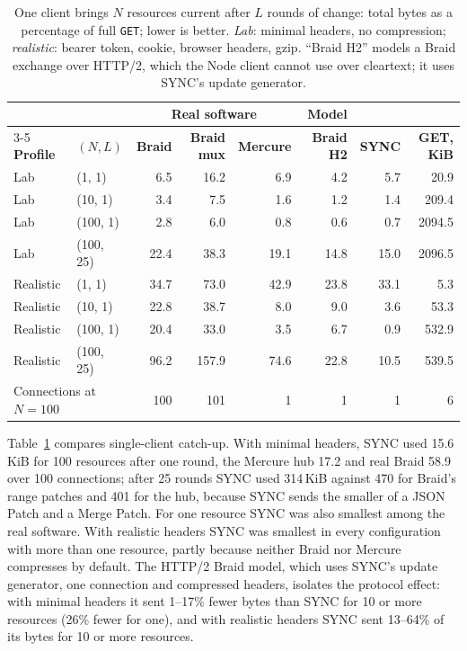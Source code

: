 \documentclass[11pt,a4paper]{article}
\begin{document}
\begin{table}[h]
\centering
\footnotesize
\setlength{\tabcolsep}{4pt}
\begin{tabular}{llrrrrrr}
\toprule
 & & \multicolumn{3}{c}{\textbf{Real software}} & \textbf{Model} & & \\
\cmidrule(lr){3-5}
\textbf{Profile} & $(N, L)$ & \textbf{Braid} & \textbf{Braid mux} & \textbf{Mercure} & \textbf{Braid H2} & \textbf{SYNC} & \textbf{GET, KiB} \\
\midrule
Lab       & (1, 1)    & 6.5  & 16.2  & 6.9   & 4.2  & 5.7  & 20.9 \\
Lab       & (10, 1)   & 3.4  & 7.5   & 1.6   & 1.2  & 1.4  & 209.4 \\
Lab       & (100, 1)  & 2.8  & 6.0   & 0.8   & 0.6  & 0.7  & 2094.5 \\
Lab       & (100, 25) & 22.4 & 38.3  & 19.1  & 14.8 & 15.0 & 2096.5 \\
Realistic & (1, 1)    & 34.7 & 73.0  & 42.9  & 23.8 & 33.1 & 5.3 \\
Realistic & (10, 1)   & 22.8 & 38.7  & 8.0   & 9.0  & 3.6  & 53.3 \\
Realistic & (100, 1)  & 20.4 & 33.0  & 3.5   & 6.7  & 0.9  & 532.9 \\
Realistic & (100, 25) & 96.2 & 157.9 & 74.6  & 22.8 & 10.5 & 539.5 \\
\midrule
\multicolumn{2}{l}{Connections at $N=100$} & 100 & 101 & 1 & 1 & 1 & 6 \\
\bottomrule
\end{tabular}
\caption{One client brings $N$ resources current after $L$ rounds of change: total bytes as a percentage of full \texttt{GET}; lower is better. \emph{Lab}: minimal headers, no compression; \emph{realistic}: bearer token, cookie, browser headers, gzip. ``Braid H2'' models a Braid exchange over HTTP/2, which the Node client cannot use over cleartext; it uses SYNC's update generator.}
\label{tab:bytes}
\end{table}

Table~\ref{tab:bytes} compares single-client catch-up. With minimal headers, SYNC used 15.6\,KiB for 100 resources after one round, the Mercure hub 17.2 and real Braid 58.9 over 100 connections; after 25 rounds SYNC used 314\,KiB against 470 for Braid's range patches and 401 for the hub, because SYNC sends the smaller of a JSON Patch and a Merge Patch. For one resource SYNC was also smallest among the real software. With realistic headers SYNC was smallest in every configuration with more than one resource, partly because neither Braid nor Mercure compresses by default. The HTTP/2 Braid model, which uses SYNC's update generator, one connection and compressed headers, isolates the protocol effect: with minimal headers it sent 1--17\% fewer bytes than SYNC for 10 or more resources (26\% fewer for one), and with realistic headers SYNC sent 13--64\% of its bytes for 10 or more resources.
\end{document}
